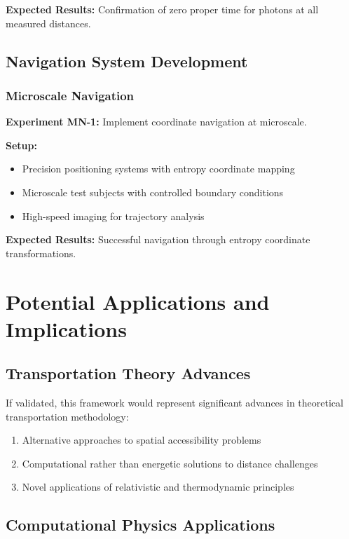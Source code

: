 \documentclass[12pt,a4paper]{article}
\begin{document}
\textbf{Expected Results:} Confirmation of zero proper time for photons at all measured distances.

\subsection{Navigation System Development}

\subsubsection{Microscale Navigation}

\textbf{Experiment MN-1:} Implement coordinate navigation at microscale.

\textbf{Setup:}
\begin{itemize}
\item Precision positioning systems with entropy coordinate mapping
\item Microscale test subjects with controlled boundary conditions
\item High-speed imaging for trajectory analysis
\end{itemize}

\textbf{Expected Results:} Successful navigation through entropy coordinate transformations.

\section{Potential Applications and Implications}

\subsection{Transportation Theory Advances}

If validated, this framework would represent significant advances in theoretical transportation methodology:

\begin{enumerate}
\item Alternative approaches to spatial accessibility problems
\item Computational rather than energetic solutions to distance challenges
\item Novel applications of relativistic and thermodynamic principles
\end{enumerate}

\subsection{Computational Physics Applications}
\end{document}
